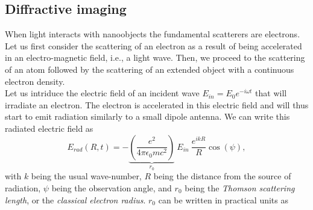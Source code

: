 \subsection{Diffractive imaging}\label{sec:saxs}
When light interacts with nanoobjects the fundamental scatterers are electrons. Let us first consider the scattering of an electron as a result of being accelerated in an electro-magnetic field, i.e., a light wave. Then, we proceed to the scattering of an atom followed by the scattering of an extended object with a continuous electron density.\\[1\baselineskip]
Let us intriduce the electric field of an incident wave $E_{in}=E_{0}e^{-i\omega t}$ that will irradiate an electron. The electron is accelerated in this electric field and will thus start to emit radiation similarly to a small dipole antenna. We can write this radiated electric field as \citep{Als-Nielson-2011-JWS}
\begin{equation}
E_{rad}(R,t)=-\underbrace{\left(\frac{e^2}{4\pi \epsilon_0 m c^2}\right)}_{r_{0}}\ E_{in}\ \frac{e^{i k R}}{R} \cos\left(\psi\right),
\label{eq:radiated-by-electron}
\end{equation}
with $k$ being the usual wave-number, $R$ being the distance from the source of radiation, $\psi$ being the observation angle, and $r_0$ being the \textit{Thomson scattering length}, or the \textit{classical electron radius}. $r_0$ can be written in practical units as
